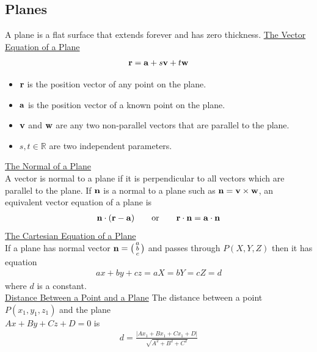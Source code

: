 \documentclass[10pt, a4paper, titlepage]{article}
\begin{document}
\begin{multicols*}{3}
	\dotfill
	\subsection{Planes}
	A plane is a flat surface that extends forever and has zero thickness.
	\underline{The Vector Equation of a Plane}
	\begin{align}
		\vb{r}=\vb{a}+s\vb{v}+t\vb{w}
	\end{align}
	\begin{itemize}
		\item $\vb{r}$ is the position vector of any point on the plane.
		\item $\vb{a}$ is the position vector of a known point on the plane.
		\item $\vb{v}$ and $\vb{w}$ are any two non-parallel vectors that are parallel to the plane.
		\item $s,t\in\mathbb{R}$ are two independent parameters.
	\end{itemize}
	\underline{The Normal of a Plane}\\
	A vector is normal to a plane if it is perpendicular to all vectors which are parallel to the plane. If $\vb{n}$ is a normal to a plane such as $\vb{n}=\vb{v}\times\vb{w}$, an equivalent vector equation of a plane is
	\begin{align}
		\vb{n}\cdot(\vb{r}-\vb{a})\qquad\text{or}\qquad\vb{r}\cdot\vb{n}=\vb{a}\cdot\vb{n}
	\end{align}
	\underline{The Cartesian Equation of a Plane}\\
	If a plane has normal vector $\vb{n}=\big(\begin{smallmatrix}a \\b \\c \end{smallmatrix}\big)$
	and passes through $P(X, Y, Z)$ then it has equation
	\begin{align}
		ax+by+cz=aX=bY=cZ=d
	\end{align}
	where $d$ is a constant.\\

	\underline{Distance Between a Point and a Plane}
	The distance between a point $P(x_1,y_1,z_1)$ and  the plane \\$Ax+By+Cz+D=0$ is
	\begin{align}
		d=\frac{|Ax_1+Bx_1+Cx_1+D|}{\sqrt{A^2+B^2+C^2}}
	\end{align}


\end{multicols*}
\end{document}
